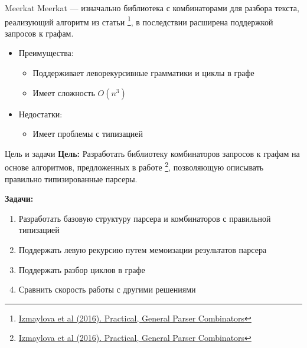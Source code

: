 \documentclass[aspectratio=169]{beamer}
\begin{document}
\begin{frame}{Meerkat}
  Meerkat --- изначально библиотека с комбинаторами для разбора текста, реализующий алгоритм из статьи \footnote{\href{https://dl.acm.org/doi/10.1145/2847538.2847539}
    {Izmaylova et al (2016). Practical, General Parser Combinators}}, в последствии расширена поддержкой запросов к графам.
  \begin{itemize}
    \item Преимущества:
          \begin{itemize}
            \item Поддерживает леворекурсивные грамматики и циклы в графе
            \item Имеет сложность $O(n^3)$
          \end{itemize}
          \vspace{0.5cm}
    \item Недостатки:
          \begin{itemize}
            \item Имеет проблемы с типизацией
          \end{itemize}
  \end{itemize}
\end{frame}


\begin{frame}{Цель и задачи}
  \textbf{Цель:} Разработать библиотеку комбинаторов запросов к графам на основе алгоритмов, предложенных в работе \footnote[1]{\href{https://dl.acm.org/doi/10.1145/2847538.2847539}
  {Izmaylova et al (2016). Practical, General Parser Combinators}}, позволяющую описывать правильно типизированные парсеры.

  \textbf{Задачи:}
  \begin{enumerate}
    \item Разработать базовую структуру парсера и комбинаторов с правильной типизацией
    \item Поддержать левую рекурсию путем мемоизации результатов парсера
    \item Поддержать разбор циклов в графе
    \item Сравнить скорость работы с другими решениями
  \end{enumerate}
\end{frame}
\end{document}
